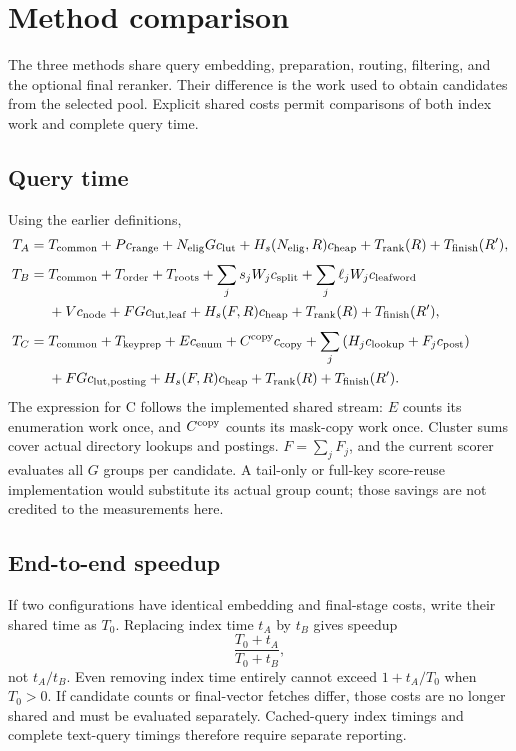 \section{Method comparison}
\label{sec:comparison}
The three methods share query embedding, preparation, routing, filtering, and the optional
final reranker. Their difference is the work used to obtain candidates from the selected pool.
Explicit shared costs permit comparisons of both index work and complete query time.

\subsection{Query time}
Using the earlier definitions,
\begin{align}
T_A={}&T_{\mathrm{common}}+P c_{\rm range}
 +N_{\mathrm{elig}} Gc_{\rm lut}+H_s(N_{\mathrm{elig}},R)c_{\rm heap}
 +T_{\rm rank}(R)+T_{\mathrm{finish}}(R'),\label{eq:final-A}\\[3pt]
T_B={}&T_{\mathrm{common}}+T_{\rm order}+T_{\rm roots}
 +\sum_j s_jW_jc_{\rm split}+\sum_j\ell_jW_jc_{\rm leafword}\notag\\
 &+Vc_{\rm node}+FGc_{\rm lut,leaf}
 +H_s(F,R)c_{\rm heap}+T_{\rm rank}(R)+T_{\mathrm{finish}}(R'),\label{eq:final-B}\\[3pt]
T_C={}&T_{\mathrm{common}}+T_{\rm keyprep}+E c_{\rm enum}+C^{\rm copy}c_{\rm copy}
 +\sum_j\left(H_jc_{\rm lookup}+F_jc_{\rm post}\right)\notag\\
 &+FGc_{\rm lut,posting}+H_s(F,R)c_{\rm heap}
 +T_{\rm rank}(R)+T_{\mathrm{finish}}(R').\label{eq:final-C}
\end{align}
The expression for C follows the implemented shared stream: $E$ counts its enumeration work once,
and $C^{\rm copy}$ counts its mask-copy work once. Cluster sums cover actual directory lookups
and postings. $F=\sum_jF_j$, and the current scorer evaluates all $G$ groups per candidate.
A tail-only or full-key score-reuse implementation would substitute its actual group count;
those savings are not credited to the measurements here.

\subsection{End-to-end speedup}
If two configurations have identical embedding and final-stage costs, write their shared time
as $T_0$. Replacing index time $t_A$ by $t_B$ gives speedup
\[
\frac{T_0+t_A}{T_0+t_B},
\]
not $t_A/t_B$. Even removing index time entirely cannot exceed $1+t_A/T_0$ when $T_0>0$.
If candidate counts or final-vector fetches differ, those costs are no longer shared and must
be evaluated separately. Cached-query index timings and complete text-query timings
therefore require separate reporting.

